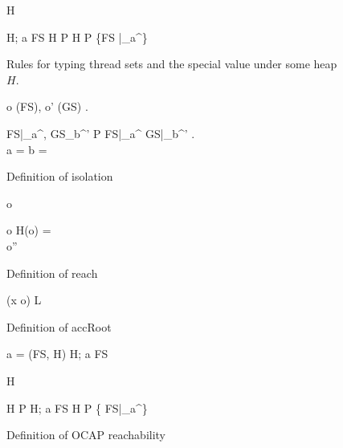 \begin{figure}
  {H \vdash \emptyset}

  \RuleSpace{}

  { H; a \vdash FS \andalso H \vdash P }
  { H \vdash P \cup \left\{FS |_a^\iota \right\} }

  \caption{Rules for typing thread sets and the special value \Error{} under some heap $H$.}
  \label{fig:ts_typing}
\end{figure}

\begin{figure}
  { 
    \forall o \in \accRoots(FS), o' \in \accRoots(GS) . \: 
  }
  {
  }
  
  \RuleSpace{}

  {
    \forall FS|_a^\iota, GS_b^{\iota'} \in P  FS|_a^\iota \neq
    GS|_b^{\iota'} . \\
    a = \ocap \: \lor \: b = \ocap \implies {}
  }
  {
  }
  \caption{Definition of isolation}
  \label{fig:def_isolation}
\end{figure}

\begin{figure}
  {o \in {}}
  {}

  \RuleSpace{}

  {
    o \in {} \andalso H(o) =  \\
    o'' \in {} \andalso {}
  }
  {  }
  \caption{Definition of reach}
  \label{fig:def_reach}
\end{figure}

\begin{figure}
  { (x \mapsto o) \in L }
  {  }

  \RuleSpace{}

  {  \: \lor \:  }
  {  }
  \caption{Definition of accRoot}
  \label{fig:def_accroot}
\end{figure}

\begin{figure}
  { a = \ocap \implies \ocrloc(FS, H) }
  { H; a \vdash FS \tsep \ocr }

  \RuleSpace{}

  {H \vdash \emptyset \tsep \ocr}

  \RuleSpace{}

  {H \vdash P \tsep \ocr \andalso H; a \vdash FS \tsep \ocr}
  {H \vdash P \cup \left\{ FS|_a^\iota \right\} \tsep \ocr}

  \caption{Definition of OCAP reachability}
  \label{fig:def_ocapreach}
\end{figure}

